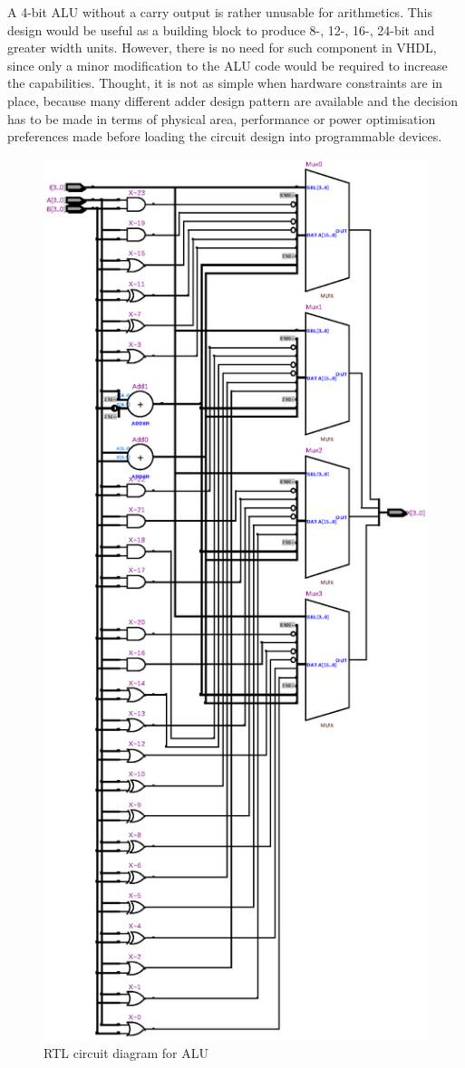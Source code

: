 \documentclass[10pt,a4paper]{report}
\begin{document}
 A 4-bit ALU without a carry output is rather unusable
 for arithmetics. This design would be useful as a building
 block to produce 8-, 12-, 16-, 24-bit and greater width
 units. However, there is no need for such component in VHDL,
 since only a minor modification to the ALU code  would be
 required to increase the capabilities. Thought, it is not
 as simple when hardware constraints are in place, because
 many different adder design pattern are available and the
 decision has to be made in terms of physical area, performance
 or power optimisation preferences made before loading the
 circuit design into programmable devices.

\begin{figure}
\includegraphics[scale=0.7]{graphs/alu_4bit.rtl.ps}
\caption{\small{RTL circuit diagram for ALU}} \label{rtl:alu}
\end{figure}
\pagebreak
\end{document}
